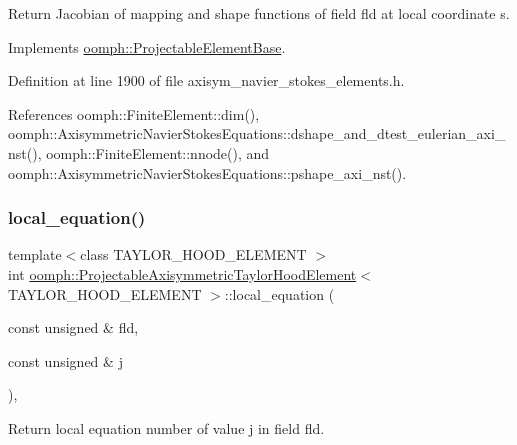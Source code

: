 Return Jacobian of mapping and shape functions of field fld at local coordinate s. 



Implements \hyperlink{classoomph_1_1ProjectableElementBase_ad45c21b58c0985d52f68ab2d79cbb488}{oomph\+::\+Projectable\+Element\+Base}.



Definition at line 1900 of file axisym\+\_\+navier\+\_\+stokes\+\_\+elements.\+h.



References oomph\+::\+Finite\+Element\+::dim(), oomph\+::\+Axisymmetric\+Navier\+Stokes\+Equations\+::dshape\+\_\+and\+\_\+dtest\+\_\+eulerian\+\_\+axi\+\_\+nst(), oomph\+::\+Finite\+Element\+::nnode(), and oomph\+::\+Axisymmetric\+Navier\+Stokes\+Equations\+::pshape\+\_\+axi\+\_\+nst().

\mbox{\label{classoomph_1_1ProjectableAxisymmetricTaylorHoodElement_a59807f4f9393d5140ba64930d3d2d036}} 
\subsubsection{\texorpdfstring{local\+\_\+equation()}{local\_equation()}}
{\footnotesize\ttfamily template$<$class T\+A\+Y\+L\+O\+R\+\_\+\+H\+O\+O\+D\+\_\+\+E\+L\+E\+M\+E\+NT $>$ \\
int \hyperlink{classoomph_1_1ProjectableAxisymmetricTaylorHoodElement}{oomph\+::\+Projectable\+Axisymmetric\+Taylor\+Hood\+Element}$<$ T\+A\+Y\+L\+O\+R\+\_\+\+H\+O\+O\+D\+\_\+\+E\+L\+E\+M\+E\+NT $>$\+::local\+\_\+equation (\begin{DoxyParamCaption}\item[{const unsigned \&}]{fld,  }\item[{const unsigned \&}]{j }\end{DoxyParamCaption})\hspace{0.3cm}{\ttfamily [inline]}, {\ttfamily [virtual]}}



Return local equation number of value j in field fld. 



